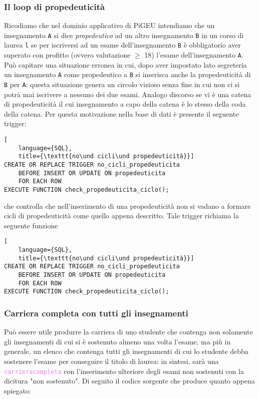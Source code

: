 \documentclass{article}
\newcommand{\sqlfunc}[1]{\texttt{\textcolor{violet}{#1}}}
\newcommand{\und}[0]{\textunderscore}
\begin{document}
\subsubsection{Il loop di propedeuticità}
Ricodiamo che nel dominio applicativo di PiGEU intendiamo che un insegnamento \texttt{A} si dice \textit{propedeutico} ad un altro insegnamento \texttt{B} in un corso di laurea \texttt{l} se per iscriversi ad un esame dell'insegnamento \texttt{B} è obbligatorio aver superato con profitto (ovvero valutazione $\geq$ 18) l'esame dell'insegnamento \texttt{A}.
Può capitare una situazione erronea in cui, dopo aver impostato lato segreteria un insegnamento \texttt{A} come propedeutico a \texttt{B} si inserisca anche la propedeuticità di \texttt{B} per \texttt{A}: questa situazione genera un circolo vizioso senza fine in cui non ci si potrà mai iscrivere a nessuno dei due esami. Analogo discorso se vi è una catena di propedeuticità il cui insegnamento a capo della catena è lo stesso della coda della catena.
Per questa motivazione nella base di dati è presente il seguente trigger:
\begin{lstlisting}[
    language={SQL},
    title={\texttt{no\und cicli\und propedeuticità}}]
CREATE OR REPLACE TRIGGER no_cicli_propedeuticita
    BEFORE INSERT OR UPDATE ON propedeuticita
    FOR EACH ROW
EXECUTE FUNCTION check_propedeuticita_ciclo();
\end{lstlisting}

che controlla che nell'inserimento di una propedeuticità non si vadano a formare cicli di propedeuticità come quello appena descritto. Tale trigger richiama la seguente funzione

\begin{lstlisting}[
    language={SQL},
    title={\texttt{no\und cicli\und propedeuticità}}]
CREATE OR REPLACE TRIGGER no_cicli_propedeuticita
    BEFORE INSERT OR UPDATE ON propedeuticita
    FOR EACH ROW
EXECUTE FUNCTION check_propedeuticita_ciclo();
\end{lstlisting}

\subsubsection{Carriera completa con tutti gli insegnamenti}
Può essere utile produrre la carriera di uno studente che contenga non solamente gli insegnamenti di cui si è sostenuto almeno una volta l'esame, ma più in generale, un elenco che contenga tutti gli insegnamenti di cui lo studente debba sostenere l'esame per conseguire il titolo di laurea: in sintesi, sarà una \sqlfunc{carriera\und completa} con l'inserimento ulteriore degli esami non sostenuti con la dicitura "non sostenuto". Di seguito il codice sorgente che produce quanto appena spiegato:
\end{document}

